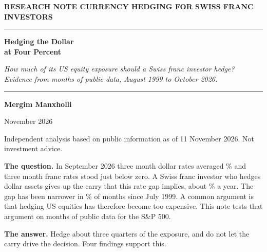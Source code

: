 \documentclass[a4paper,fontsize=10.2pt,parskip=half-]{scrartcl}
\newcommand{\lead}[1]{\textbf{#1}}
\begin{document}
\begin{titlepage}
\raggedright
\vspace*{2.2cm}
{\sffamily\small\bfseries RESEARCH NOTE \textbar{} CURRENCY HEDGING FOR SWISS FRANC INVESTORS\par}
\vspace{0.9cm}
\rule{\textwidth}{1.2pt}\par
\vspace{0.9cm}
{\sffamily\bfseries\fontsize{30}{35}\selectfont Hedging the Dollar\\ at Four Percent\par}
\vspace{0.9cm}
{\fontsize{14}{19}\selectfont\itshape How much of its US equity exposure should a Swiss franc investor hedge? Evidence from \NMonths{} months of public data, August 1999 to October 2026.\par}
\vspace{0.9cm}
\rule{\textwidth}{0.4pt}\par
\vfill
{\sffamily\bfseries\Large Mergim Manxholli\par}
\vspace{0.25cm}
{\sffamily\large November 2026\par}
\vspace{1.0cm}
{\sffamily\small Independent analysis based on public information as of 11 November 2026. Not investment advice.\par}
\vspace*{0.6cm}
\end{titlepage}


\lead{The question.} In September 2026 three month dollar rates averaged \IUS\% and three month franc rates stood just below zero. A Swiss franc investor who hedges dollar assets gives up the carry that this rate gap implies, about \CarryNow\% a year. The gap has been narrower in \Pctile\% of months since July 1999. A common argument is that hedging US equities has therefore become too expensive. This note tests that argument on \NMonths{} months of public data for the S\&P 500.

\lead{The answer.} Hedge about three quarters of the exposure, and do not let the carry drive the decision. Four findings support this.
\end{document}
